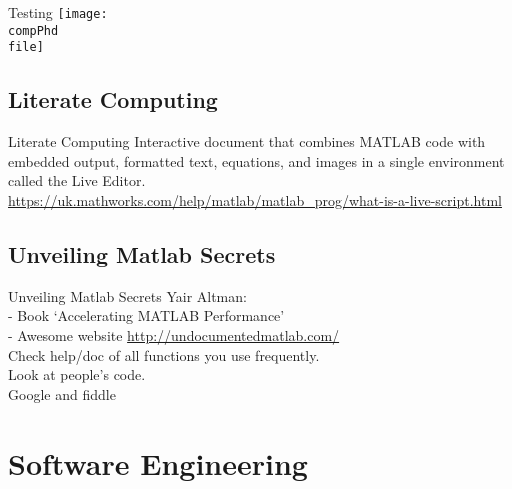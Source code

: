 \documentclass[]{beamer} %
\def\pathbase{/Users/pmxal9/} 	%
\def\pathbase{/Users/pmaal/} 	%
\edef\drop{\pathbase Dropbox/}		%
\edef\compPhd{\drop Nottingham/repos/phd/Seminars/+MatlabComputationalPhD/}
\begin{document}
\begin{frame}{Testing}\centering
\def\file{testing/runperf}
\vspace{-5mm}\hspace{-7mm}\texttt{[image: \\compPhd \\file]}
\end{frame}




\subsection{Literate Computing}
\begin{frame}{Literate Computing}\centering
Interactive document that combines MATLAB code with embedded output, 
formatted text, equations, and images in a single environment called the Live Editor.\\[2mm]
\tiny{\url{https://uk.mathworks.com/help/matlab/matlab_prog/what-is-a-live-script.html}}
\end{frame}


\subsection{Unveiling Matlab Secrets}
\begin{frame}{Unveiling Matlab Secrets}
Yair Altman: \\
- Book `Accelerating MATLAB Performance'\\
- Awesome website \url{http://undocumentedmatlab.com/}\\[3mm]
Check help/doc of all functions you use frequently.\\[3mm]
Look at people's code.\\[3mm]
Google and fiddle
\end{frame}


\section[SE]{Software Engineering}
\end{document}
